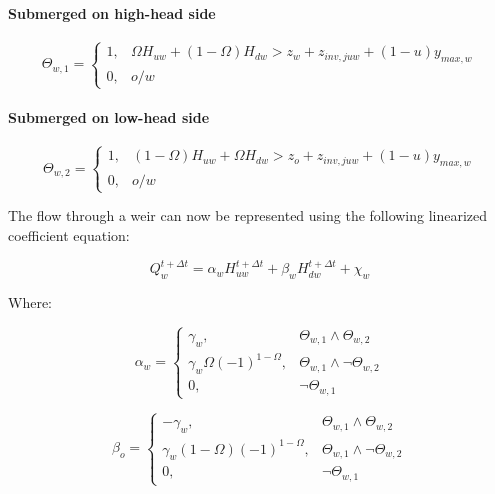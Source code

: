 \documentclass[11pt]{article}
\begin{document}
\paragraph{Submerged on high-head side}

\begin{equation}
  \Theta_{w,1} =
  \begin{cases}
    1, &   \Omega H_{uw} + (1 - \Omega) H_{dw} > z_w + z_{inv,juw} + (1 - u) y_{max,w} \\
    0, & o/w
  \end{cases}
\end{equation}

\paragraph{Submerged on low-head side}

\begin{equation}
  \Theta_{w,2} =
  \begin{cases}
    1, & (1 - \Omega) H_{uw} + \Omega H_{dw} > z_o + z_{inv,juw} + (1 - u) y_{max,w} \\
    0, & o/w
  \end{cases}
\end{equation}

The flow through a weir can now be represented using the following linearized
coefficient equation:

\begin{equation}
 Q_{w}^{t + \Delta t} = \alpha_{w} H_{uw}^{t + \Delta t} + \beta_{w} H_{dw}^{t + \Delta t} + \chi_{w} 
\end{equation}

Where:

\begin{equation}
  \alpha_{w} =
  \begin{cases}
   \gamma_w, & \Theta_{w,1} \land \Theta_{w,2}\\
   \gamma_w \Omega (-1)^{1 - \Omega}, & \Theta_{w,1} \land \lnot \Theta_{w,2}\\
   0, & \lnot \Theta_{w,1}
  \end{cases}
\end{equation}

\begin{equation}
  \beta_{o} =
  \begin{cases}
   -\gamma_w, & \Theta_{w,1} \land \Theta_{w,2}\\
   \gamma_w (1 - \Omega) (-1)^{1 - \Omega}, & \Theta_{w,1} \land \lnot \Theta_{w,2}\\
   0, & \lnot \Theta_{w,1}
  \end{cases}
\end{equation}
\end{document}
